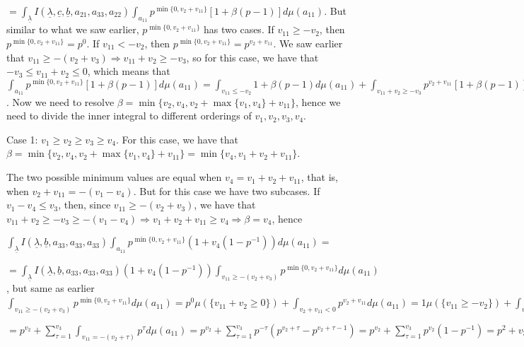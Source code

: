 \documentclass{article}
\begin{document}
$=\displaystyle\int_{\underline\lambda}I(\underline{\lambda},\underline{c},\underline{b},a_{21},a_{33},a_{22})\displaystyle\int_{a_{11}}p^{\min\{0,v_{2}+v_{11}\}}[1+\beta(p-1)]d\mu(a_{11})$. But similar to what we saw earlier, $p^{\min\{0,v_{2}+v_{11}\}}$ has two cases. If $v_{11}\geq{-v_{2}}$, then $p^{\min\{0,v_{2}+v_{11}\}}=p^{0}$. If $v_{11}<-v_{2}$, then $p^{\min\{0,v_{2}+v_{11}\}}=p^{v_{2}+v_{11}}$.
We saw earlier that $v_{11}\geq{-(v_{2}+v_{3})}\Rightarrow{v_{11}+v_{2}\geq{-v_{3}}}$, so for this case, we have that $-v_{3}\leq{v_{11}+v_{2}}\leq{0}$, which means that $\displaystyle\int_{a_{11}}p^{\min\{0,v_{2}+v_{11}\}}[1+\beta(p-1)]d\mu(a_{11})=\displaystyle\int_{v_{11}\leq{-v_{2}}}1+\beta(p-1)d\mu(a_{11})+\displaystyle\int_{v_{11}+v_{2}\geq{-v_{3}}}p^{v_{2}+v_{11}}[1+\beta(p-1)]d\mu(a_{11})=\displaystyle\int_{v_{11}\leq{-v_{2}}}1+\beta(p-1)d\mu(a_{11})+\sum_{\tau=1}^{v_{3}}\displaystyle\int_{v_{11}\geq{-(v_{3}+v_{2})}}p^{-\tau}[1+\beta(p-1)]d\mu(a_{11})$. Now we need to resolve $\beta=\min\{v_{2},v_{4},v_{2}+\max\{v_{1},v_{4}\}+v_{11}\}$, hence we need to divide the inner integral to different orderings of $v_{1},v_{2},v_{3},v_{4}$.

Case 1: $v_{1}\geq{v_{2}}\geq{v_{3}}\geq{v_{4}}$.
For this case, we have that $\beta=\min\{v_{2},v_{4},v_{2}+\max\{v_{1},v_{4}\}+v_{11}\}=\min\{v_{4},v_{1}+v_{2}+v_{11}\}$.

The two possible minimum values are equal when $v_{4}=v_{1}+v_{2}+v_{11}$, that is, when $v_{2}+v_{11}=-(v_{1}-v_{4})$. But for this case we have two subcases. If $v_{1}-v_{4}\leq{v_{3}}$, then, since $v_{11}\geq{-(v_{2}+v_{3})}$, we have that $v_{11}+v_{2}\geq{-v_{3}}\geq{-(v_{1}-v_{4})}\Rightarrow{v_{1}+v_{2}+v_{11}\geq{v_{4}}}\Rightarrow{\beta=v_{4}}$, hence 

$\displaystyle\int_{\underline{\lambda}}I(\underline{\lambda},\underline{b},a_{33},a_{33},a_{33})\int_{a_{11}}p^{\min\{0,v_{2}+v_{11}\}}(1+v_{4}(1-p^{-1}))d\mu(a_{11})=$

$=\displaystyle\int_{\underline{\lambda}}I(\underline{\lambda},\underline{b},a_{33},a_{33},a_{33})(1+v_{4}(1-p^{-1}))\int_{v_{11}\geq{-(v_{2}+v_{3})}}p^{\min\{0,v_{2}+v_{11}\}}d\mu(a_{11})$, but same as earlier $\displaystyle\int_{v_{11}\geq{-(v_{2}+v_{3})}}p^{\min\{0,v_{2}+v_{11}\}}d\mu(a_{11})=p^{0}\mu(\{v_{11}+v_{2}\geq{0}\})+\displaystyle\int_{{v_{2}+v_{11}}<{0}}p^{v_{2}+v_{11}}d\mu(a_{11})=1\mu(\{v_{11}\geq{-v_{2}}\})+\displaystyle\int_{{v_{2}+v_{11}}<{0}}p^{v_{2}+v_{11}}d\mu(a_{11})=p^{v_{2}}+\displaystyle\int_{-v_{3}\leq{v_{11}}<-v_{2}}p^{v_{2}+v_{11}}d\mu(a_{11})=p^{v_{2}}+\sum_{\tau=-v_{3}}^{-(v_{2}+1)}\displaystyle\int_{v_{11}=\tau}p^{v_{2}+\tau}d\mu(a_{11})=$

$=p^{v_{2}}+\sum_{\tau=1}^{v_{3}}\displaystyle\int_{v_{11}=-(v_{2}+\tau)}p^{\tau}d\mu(a_{11})=p^{v_{2}}+\sum_{\tau=1}^{v_{3}}p^{-\tau}(p^{v_{2}+\tau}-p^{v_{2}+\tau-1})=p^{v_{2}}+\sum_{\tau=1}^{v_{3}}p^{v_{2}}(1-p^{-1})=p^{2}+v_{3}=p^{v_{2}}(1+v_{3}(1-p^{-1}))$
\end{document}
